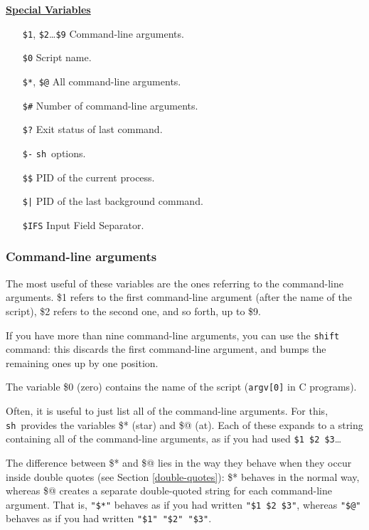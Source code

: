 \documentclass{article}
\newcommand{\heading}[1]{%
  \begin{center}
    \large\textbf{\underline{#1}}
  \end{center}
  \vspace{1ex minus 1ex}}
\newcommand{\code}[1]{\texttt{#1}}
\newcommand{\sh}{\code{sh}}
\newlength{\slidewidth}
\newenvironment{boxit}{%
  \begin{lrbox}{\savepar}
  \begin{minipage}[b]{\slidewidth}%
}{
  \end{minipage}
  \end{lrbox}
  \fbox{\usebox{\savepar}}
}
\newcommand{\slidecaption}{}
\newenvironment{slide}[1]{%
\renewcommand\figurename{Slide}
\renewcommand{\slidecaption}{#1}
\bigskip
\begin{boxit}
\heading{\slidecaption}
}{%
\end{boxit}
\bigskip
}
\begin{document}
\begin{slide}{Special Variables}
\begin{center}
\begingroup
\settowidth{\leftmargini}{\code{\$1}, \code{\$2}\ldots\code{\$9}}
\addtolength{\leftmargini}{1em}
\begin{itemize}
\item[\code{\$1}, \code{\$2}\ldots\code{\$9}]
	Command-line arguments.
\item[\code{\$0}]
	Script name.
\item[\code{\$*}, \code{\$@}]
	All command-line arguments.
\item[\code{\$\#}]
	Number of command-line arguments.
\item[\code{\$?}]
	Exit status of last command.
\item[\code{\$-}]
	\sh\ options.
\item[\code{\$\$}]
	PID of the current process.
\item[\code{\$|}]
	PID of the last background command.
\item[\code{\$IFS}]
	Input Field Separator.
\end{itemize}
\endgroup
\end{center}
\end{slide}

\subsubsection{Command-line arguments}

	The most useful of these variables are the ones referring to
the command-line arguments. \$1 refers to the first command-line
argument (after the name of the script), \$2 refers to the second one,
and so forth, up to \$9.

	If you have more than nine command-line arguments, you can use
the \code{shift} command: this discards the first command-line
argument, and bumps the remaining ones up by one position.

	The variable \$0 (zero) contains the name of the script
(\code{argv[0]} in C programs).

	Often, it is useful to just list all of the command-line
arguments. For this, \sh\ provides the variables \$* (star) and \$@
(at). Each of these expands to a string containing all of the
command-line arguments, as if you had used \code{\$1 \$2 \$3}\ldots

	The difference between \$* and \$@ lies in the way they behave
when they occur inside double quotes (see Section
\ref{double-quotes}): \$* behaves in the normal way, whereas \$@
creates a separate double-quoted string for each command-line
argument. That is, \code{"\$*"} behaves as if you had written
\code{"\$1 \$2 \$3"}, whereas \code{"\$@"} behaves as if you had
written \code{"\$1" "\$2" "\$3"}.
\end{document}
